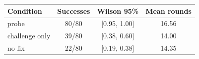 \begin{tabular}{lccc}
\toprule
Condition & Successes & Wilson 95\% & Mean rounds \\
\midrule
probe & 80/80 & [0.95, 1.00] & 16.56 \\
challenge only & 39/80 & [0.38, 0.60] & 14.00 \\
no fix & 22/80 & [0.19, 0.38] & 14.35 \\
\bottomrule
\end{tabular}
